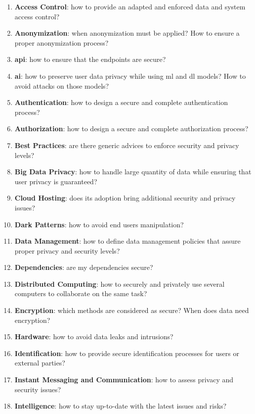 \begin{enumerate}
    \setlength\itemsep{-0.5em}
    \item \textbf{Access Control}: how to provide an adapted and enforced data and system access control?
    \item \textbf{Anonymization}: when anonymization must be applied? How to ensure a proper anonymization process?
    \item \textbf{\acrlong*{api}}: how to ensure that the endpoints are secure?
    \item \textbf{\acrlong*{ai}}: how to preserve user data privacy while using \gls{ml} and \gls{dl} models? How to avoid attacks on those models?
    \item \textbf{Authentication}: how to design a secure and complete authentication process?
    \item \textbf{Authorization}: how to design a secure and complete authorization process?
    \item \textbf{Best Practices}: are there generic advices to enforce security and privacy levels?
    \item \textbf{Big Data Privacy}: how to handle large quantity of data while ensuring that user privacy is guaranteed?
    \item \textbf{Cloud Hosting}: does its adoption bring additional security and privacy issues?
    \item \textbf{Dark Patterns}: how to avoid end users manipulation?
    \item \textbf{Data Management}: how to define data management policies that assure proper privacy and security levels?
    \item \textbf{Dependencies}: are my dependencies secure?
    \item \textbf{Distributed Computing}: how to securely and privately use several computers to collaborate on the same task?
    \item \textbf{Encryption}: which methods are considered as secure? When does data need encryption?
    \item \textbf{Hardware}: how to avoid data leaks and intrusions?
    \item \textbf{Identification}: how to provide secure identification processes for users or external parties?
    \item \textbf{Instant Messaging and Communication}: how to assess privacy and security issues?
    \item \textbf{Intelligence}: how to stay up-to-date with the latest issues and risks?

\end{enumerate}
